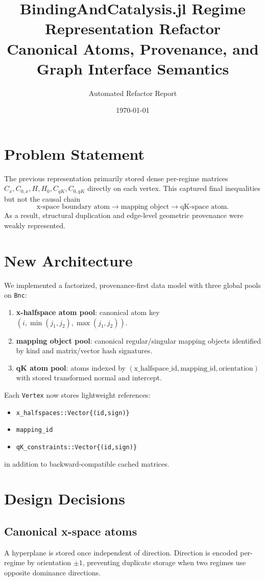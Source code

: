 \documentclass[11pt]{article}
\title{BindingAndCatalysis.jl Regime Representation Refactor\\Canonical Atoms, Provenance, and Graph Interface Semantics}
\author{Automated Refactor Report}
\date{\today}
\begin{document}
\maketitle

\section{Problem Statement}
The previous representation primarily stored dense per-regime matrices $C_x,C_{0,x},H,H_0,C_{qK},C_{0,qK}$ directly on each vertex. This captured final inequalities but not the causal chain
\[
\text{x-space boundary atom} \to \text{mapping object} \to \text{qK-space atom}.
\]
As a result, structural duplication and edge-level geometric provenance were weakly represented.

\section{New Architecture}
We implemented a factorized, provenance-first data model with three global pools on \texttt{Bnc}:
\begin{enumerate}[label=(\alph*)]
\item \textbf{x-halfspace atom pool}: canonical atom key $(i,\min(j_1,j_2),\max(j_1,j_2))$.
\item \textbf{mapping object pool}: canonical regular/singular mapping objects identified by kind and matrix/vector hash signatures.
\item \textbf{qK atom pool}: atoms indexed by $(\text{x\_halfspace\_id},\text{mapping\_id},\text{orientation})$ with stored transformed normal and intercept.
\end{enumerate}

Each \texttt{Vertex} now stores lightweight references:
\begin{itemize}
\item \texttt{x\_halfspaces::Vector\{(id,sign)\}}
\item \texttt{mapping\_id}
\item \texttt{qK\_constraints::Vector\{(id,sign)\}}
\end{itemize}
in addition to backward-compatible cached matrices.

\section{Design Decisions}
\subsection{Canonical x-space atoms}
A hyperplane is stored once independent of direction. Direction is encoded per-regime by orientation $\pm1$, preventing duplicate storage when two regimes use opposite dominance directions.
\end{document}
